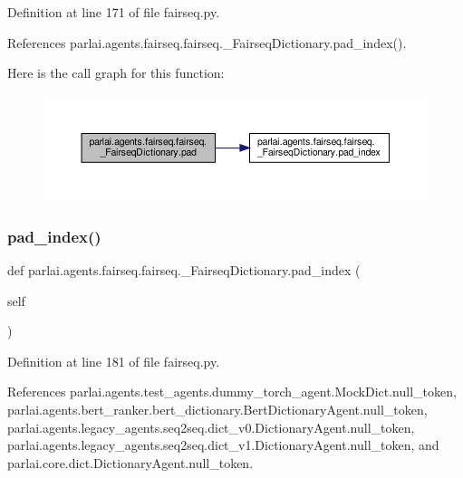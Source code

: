 Definition at line 171 of file fairseq.\+py.



References parlai.\+agents.\+fairseq.\+fairseq.\+\_\+\+Fairseq\+Dictionary.\+pad\+\_\+index().

Here is the call graph for this function\+:
\nopagebreak
\begin{figure}[H]
\begin{center}
\leavevmode
\includegraphics[width=350pt]{classparlai_1_1agents_1_1fairseq_1_1fairseq_1_1__FairseqDictionary_a8687767f003b2a054d32690d820d2702_cgraph}
\end{center}
\end{figure}
\mbox{\label{classparlai_1_1agents_1_1fairseq_1_1fairseq_1_1__FairseqDictionary_a9712a14ee88222b6e8f97c14326f1082}} 
\subsubsection{\texorpdfstring{pad\+\_\+index()}{pad\_index()}}
{\footnotesize\ttfamily def parlai.\+agents.\+fairseq.\+fairseq.\+\_\+\+Fairseq\+Dictionary.\+pad\+\_\+index (\begin{DoxyParamCaption}\item[{}]{self }\end{DoxyParamCaption})}



Definition at line 181 of file fairseq.\+py.



References parlai.\+agents.\+test\+\_\+agents.\+dummy\+\_\+torch\+\_\+agent.\+Mock\+Dict.\+null\+\_\+token, parlai.\+agents.\+bert\+\_\+ranker.\+bert\+\_\+dictionary.\+Bert\+Dictionary\+Agent.\+null\+\_\+token, parlai.\+agents.\+legacy\+\_\+agents.\+seq2seq.\+dict\+\_\+v0.\+Dictionary\+Agent.\+null\+\_\+token, parlai.\+agents.\+legacy\+\_\+agents.\+seq2seq.\+dict\+\_\+v1.\+Dictionary\+Agent.\+null\+\_\+token, and parlai.\+core.\+dict.\+Dictionary\+Agent.\+null\+\_\+token.




